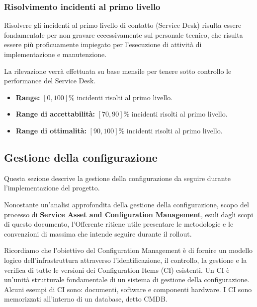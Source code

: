 			\subsubsection{Risolvimento incidenti al primo livello}
            	Risolvere gli incidenti al primo livello di contatto (Service Desk) risulta essere fondamentale per non gravare eccessivamente sul personale tecnico, che risulta essere più proficuamente impiegato per l'esecuzione di attività di implementazione e manutenzione. 
                
                
                La rilevazione verrà effettuata su base mensile per tenere sotto controllo le performance del Service Desk.
                
                \begin{itemize}
            		\item\textbf{ Range:} $[0, 100] \% $ incidenti risolti al primo livello.
                    \item \textbf{Range di accettabilità:} $[70, 90] \%$ incidenti risolti al primo livello.
                    \item \textbf{Range di ottimalità:} $[90, 100] \%$ incidenti risolti al primo livello.
            	\end{itemize}
                
		\subsection{Gestione della configurazione}
        	Questa sezione descrive la gestione della configurazione da seguire durante l'implementazione del progetto.
            
            
            Nonostante un'analisi approfondita della gestione della configurazione, scopo del processo di \textbf{Service Asset and Configuration Management}, esuli dagli scopi di questo documento, l'Offerente ritiene utile presentare le metodologie e le convenzioni di massima che intende seguire durante il rollout.
            
            
            Ricordiamo che l'obiettivo del Configuration Management è di fornire un modello logico dell'infrastruttura attraverso l'identificazione, il controllo, la gestione e la verifica di tutte le versioni dei Configuration Items (CI) esistenti. Un CI è un'unità strutturale fondamentale di un sistema di gestione della configurazione. Alcuni esempi di CI sono: documenti, software e componenti hardware. I CI sono memorizzati all'interno di un database, detto CMDB.
            
